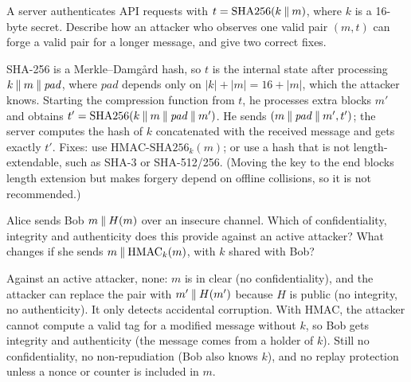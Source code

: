 \begin{exercise}
A server authenticates API requests with $t = \mathrm{SHA256}(k \mathbin{\|} m)$, where $k$ is a 16-byte secret. Describe how an attacker who observes one valid pair $(m, t)$ can forge a valid pair for a longer message, and give two correct fixes.
\end{exercise}
\begin{solution}
SHA-256 is a Merkle--Damgård hash, so $t$ is the internal state after processing $k \mathbin{\|} m \mathbin{\|} \mathit{pad}$, where $\mathit{pad}$ depends only on $|k| + |m| = 16 + |m|$, which the attacker knows. Starting the compression function from $t$, he processes extra blocks $m'$ and obtains $t' = \mathrm{SHA256}(k \mathbin{\|} m \mathbin{\|} \mathit{pad} \mathbin{\|} m')$. He sends $(m \mathbin{\|} \mathit{pad} \mathbin{\|} m', t')$; the server computes the hash of $k$ concatenated with the received message and gets exactly $t'$. Fixes: use $\mathrm{HMAC\text{-}SHA256}_k(m)$; or use a hash that is not length-extendable, such as SHA-3 or SHA-512/256. (Moving the key to the end blocks length extension but makes forgery depend on offline collisions, so it is not recommended.)
\end{solution}

\begin{exercise}
Alice sends Bob $m \mathbin{\|} H(m)$ over an insecure channel. Which of confidentiality, integrity and authenticity does this provide against an active attacker? What changes if she sends $m \mathbin{\|} \mathrm{HMAC}_k(m)$, with $k$ shared with Bob?
\end{exercise}
\begin{solution}
Against an active attacker, none: $m$ is in clear (no confidentiality), and the attacker can replace the pair with $m' \mathbin{\|} H(m')$ because $H$ is public (no integrity, no authenticity). It only detects accidental corruption. With HMAC, the attacker cannot compute a valid tag for a modified message without $k$, so Bob gets integrity and authenticity (the message comes from a holder of $k$). Still no confidentiality, no non-repudiation (Bob also knows $k$), and no replay protection unless a nonce or counter is included in $m$.
\end{solution}

